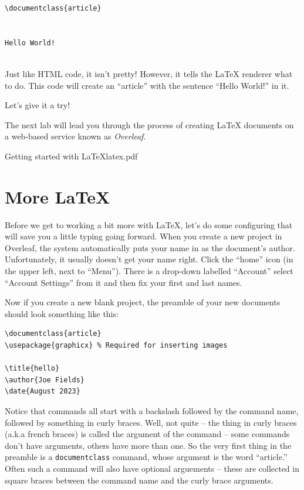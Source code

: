 \begin{codeblock}
\begin{verbatim}
\documentclass{article}


Hello World!


\end{verbatim}
\end{codeblock}

Just like HTML code, it isn't pretty! However, it tells the \LaTeX{}  
renderer what to do. This code will create an ``article'' with the
sentence ``Hello World!'' in it. 

Let's give it a try!

The next lab will lead you through the process of creating \LaTeX{} documents on a web-based service known as {\em Overleaf}.

\clearpage
\begin{worksheet}{2}{Getting started with \LaTeX}{latex.pdf}

\end{worksheet}

\section{More LaTeX}
\label{sec:more_latex}

Before we get to working a bit more with \LaTeX{}, let's do some configuring that will save you a little typing going forward.
When you create a new project in Overleaf, the system automatically puts your name in as the document's author.  Unfortunately, it usually doesn't get your name right.  Click the ``home'' icon (in the upper left, next to ``Menu'').  There is a drop-down labelled ``Account'' select ``Account Settings'' from it and then fix your first and last names.

Now if you create a new blank project, the preamble of your new documents should look something like this:

\begin{codeblock}
\begin{verbatim}
\documentclass{article}
\usepackage{graphicx} % Required for inserting images

\title{hello}
\author{Joe Fields}
\date{August 2023}

\end{verbatim}
\end{codeblock}

Notice that commands all start with a backslash followed by the command name, followed by something in curly braces.  Well, not quite -- the thing in curly braces (a.k.a french braces) is called the argument of the command -- some commands don't have arguments, others have more than one. So the very first thing in the preamble is a {\tt documentclass} command, whose argument is the word ``article.''  Often such a command will also have optional arguements -- these are collected in square braces between the command name and the curly brace arguments.

